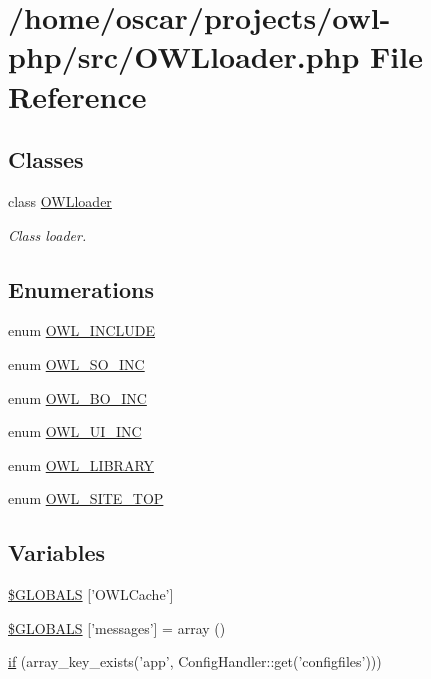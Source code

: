 \section{/home/oscar/projects/owl-\/php/src/OWLloader.php File Reference}
\label{OWLloader_8php}
\subsection*{Classes}
\begin{DoxyCompactItemize}
\item 
class \hyperlink{classOWLloader}{OWLloader}
\begin{DoxyCompactList}\small\item\em Class loader. \item\end{DoxyCompactList}\end{DoxyCompactItemize}
\subsection*{Enumerations}
\begin{DoxyCompactItemize}
\item 
enum \hyperlink{OWLloader_8php_a4d33a8f2fcc9c83cbeea921c4cb23a7f}{OWL\_\-INCLUDE} 
\item 
enum \hyperlink{OWLloader_8php_a75dffdef5ba58a0ba5f21ed40627897f}{OWL\_\-SO\_\-INC} 
\item 
enum \hyperlink{OWLloader_8php_aca50646bc73c3addf0e0f25081eae0ae}{OWL\_\-BO\_\-INC} 
\item 
enum \hyperlink{OWLloader_8php_a2e11101c70f011a91d0d9c7f8e217738}{OWL\_\-UI\_\-INC} 
\item 
enum \hyperlink{OWLloader_8php_a74eed08508c8b70677c4167acf49e427}{OWL\_\-LIBRARY} 
\item 
enum \hyperlink{OWLloader_8php_a462de9ae02e394313337afac5d1a5f95}{OWL\_\-SITE\_\-TOP} 
\end{DoxyCompactItemize}
\subsection*{Variables}
\begin{DoxyCompactItemize}
\item 
\hyperlink{OWLloader_8php_a79190ec221c2b52403f7324f1d224c8f}{\$GLOBALS} \mbox{[}'OWLCache'\mbox{]}
\item 
\hyperlink{OWLloader_8php_a65f2996116eed36e9ab25f254a470259}{\$GLOBALS} \mbox{[}'messages'\mbox{]} = array ()
\item 
\hyperlink{OWLloader_8php_a78407183564d6b92f2219d8a10b9349c}{if} (array\_\-key\_\-exists('app', ConfigHandler::get('configfiles')))
\end{DoxyCompactItemize}


